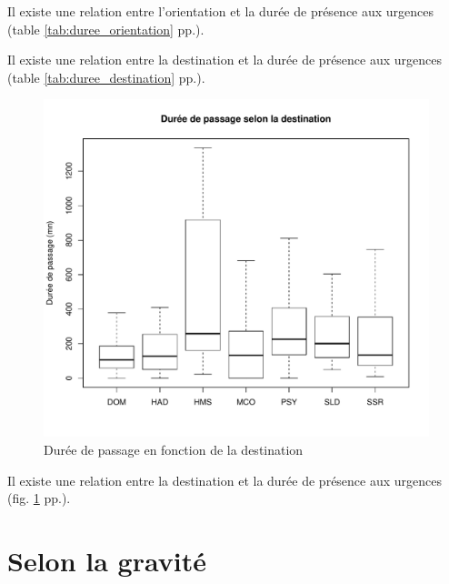\documentclass[12pt,english,french,twoside]{book}\usepackage[]{graphicx}\usepackage[]{color}
\makeatletter
\def\maxwidth{ %
  \ifdim\Gin@nat@width>\linewidth
    \linewidth
  \else
    \Gin@nat@width
  \fi
}
\newenvironment{knitrout}{}{} %
\makeatother
\begin{document}
Il existe une relation entre l'orientation et la durée de présence aux urgences (table \ref{tab:duree_orientation} pp.\pageref{tab:duree_orientation}).

Il existe une relation entre la destination et la durée de présence aux urgences (table \ref{tab:duree_destination} pp.\pageref{tab:duree_destination}).

\begin{figure}[ht!]
 \centering
\begin{knitrout}
\color{fgcolor}
\includegraphics[width=\maxwidth]{figure/bp_duree_dest} 

\end{knitrout}

 \caption{Durée de passage en fonction de la destination}
 \label{duree_dest}
\end{figure}
Il existe une relation entre la destination et la durée de présence aux urgences (fig. \ref{duree_dest} pp.\pageref{duree_dest}).


\section{Selon la gravité}
\end{document}
